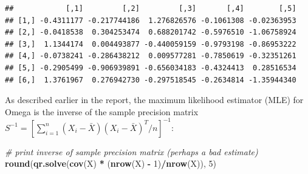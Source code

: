 \documentclass[11pt,]{book}
\newenvironment{Shaded}{\begin{snugshade}}{\end{snugshade}}
\newcommand{\CommentTok}[1]{\textcolor[rgb]{0.56,0.35,0.01}{\textit{#1}}}
\newcommand{\DataTypeTok}[1]{\textcolor[rgb]{0.13,0.29,0.53}{#1}}
\newcommand{\DecValTok}[1]{\textcolor[rgb]{0.00,0.00,0.81}{#1}}
\newcommand{\FloatTok}[1]{\textcolor[rgb]{0.00,0.00,0.81}{#1}}
\newcommand{\KeywordTok}[1]{\textcolor[rgb]{0.13,0.29,0.53}{\textbf{#1}}}
\newcommand{\NormalTok}[1]{#1}
\newcommand{\OperatorTok}[1]{\textcolor[rgb]{0.81,0.36,0.00}{\textbf{#1}}}
\newcommand{\OtherTok}[1]{\textcolor[rgb]{0.56,0.35,0.01}{#1}}
\newcommand{\StringTok}[1]{\textcolor[rgb]{0.31,0.60,0.02}{#1}}
\theoremstyle{definition}
\theoremstyle{definition}
\theoremstyle{definition}
\theoremstyle{remark}
\begin{document}
\begin{Shaded}
\end{Shaded}

\begin{verbatim}
##            [,1]         [,2]         [,3]       [,4]        [,5]
## [1,] -0.4311177 -0.217744186  1.276826576 -0.1061308 -0.02363953
## [2,] -0.0418538  0.304253474  0.688201742 -0.5976510 -1.06758924
## [3,]  1.1344174  0.004493877 -0.440059159 -0.9793198 -0.86953222
## [4,] -0.0738241 -0.286438212  0.009577281 -0.7850619 -0.32351261
## [5,] -0.2905499 -0.906939891 -0.656034183 -0.4324413  0.28516534
## [6,]  1.3761967  0.276942730 -0.297518545 -0.2634814 -1.35944340
\end{verbatim}

\vspace{0.5cm}

As described earlier in the report, the maximum likelihood estimator
(MLE) for Omega is the inverse of the sample precision matrix
\(S^{-1} = \left[\sum_{i = 1}^{n}(X_{i} - \bar{X})(X_{i} - \bar{X})^{T}/n \right]^{-1}\):

\vspace{0.5cm}

\begin{Shaded}
\begin{Highlighting}[]
\CommentTok{# print inverse of sample precision matrix (perhaps a bad estimate)}
\KeywordTok{round}\NormalTok{(}\KeywordTok{qr.solve}\NormalTok{(}\KeywordTok{cov}\NormalTok{(X) }\OperatorTok{*}\StringTok{ }\NormalTok{(}\KeywordTok{nrow}\NormalTok{(X) }\OperatorTok{-}\StringTok{ }\DecValTok{1}\NormalTok{)}\OperatorTok{/}\KeywordTok{nrow}\NormalTok{(X)), }\DecValTok{5}\NormalTok{)}
\end{Highlighting}
\end{Shaded}
\end{document}
